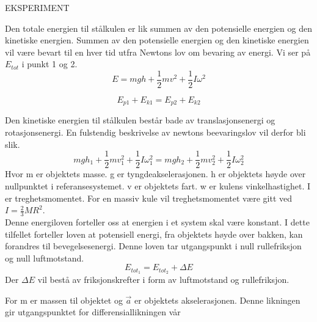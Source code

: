  EKSPERIMENT
 
 Den totale energien til stålkulen er lik summen av den potensielle energien og den kinetiske energien. Summen av den potensielle energien og den kinetiske energien vil være bevart til en hver tid utfra Newtons lov om bevaring av energi. Vi ser på $E_{tot}$ i punkt 1 og 2.
\begin{equation}
E = mgh+ \frac{1}{2}mv^2 + \frac{1}{2}I\omega^2
\end{equation}

\begin{equation}
E_{p1} + E_{k1} = E_{p2} + E_{k2}
\label{eq:Newtons Energibevaringslov} 
\end{equation}

Den kinetiske energien til stålkulen består bade av translasjonsenergi og rotasjonsenergi. En fulstendig beskrivelse av newtons beevaringslov vil derfor bli slik.
\begin{equation}
mgh_{1} + \frac{1}{2}mv_{1}^2 + \frac{1}{2}I\omega_{1}^2  = mgh_{2} + \frac{1}{2}mv_{2}^2 + \frac{1}{2}I\omega_{2}^2
\label{eq:Newtons Energibevaringslov} 
\end{equation}
Hvor m er objektets masse. g er tyngdeakselerasjonen. h er objektets høyde over nullpunktet i referansesystemet. v er objektets fart. w er kulens vinkelhastighet. I er treghetsmomentet. For en massiv kule vil treghetsmomentet være gitt ved $I = \frac{2}{3}MR^2$. \\
Denne energiloven forteller oss at energien i et system skal være konstant. I dette tilfellet forteller loven at potensiell energi, fra objektets høyde over bakken, kan forandres til bevegelsesenergi. Denne loven tar utgangspunkt i null rullefriksjon og null luftmotstand. \\


\begin{equation}
E_{tot_1} = E_{tot_2} + \Delta E
\end{equation}
Der $\Delta E$ vil bestå av friksjonskrefter i form av luftmotstand og rullefriksjon.



For m er massen til objektet og $\vec{a}$ er objektets akselerasjonen. Denne likningen gir utgangspunktet for differensiallikningen vår


